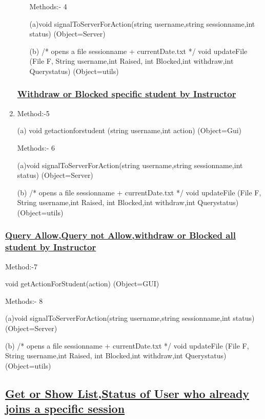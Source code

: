 \documentclass{article}
\begin{document}
\begin{enumerate}
\begin{enumerate}
Methods:- 4 

(a)void signalToServerForAction(string username,string sessionname,int status)        (Object=Server) 

(b)  /* opens a file sessionname + currentDate.txt  */ 
void updateFile (File F, String username,int Raised, int Blocked,int withdraw,int Querystatus)                 
                                                (Object=utils)
\end{enumerate}
\subsubsection*{\underline{Withdraw or Blocked specific student by Instructor}}
\item[{}{}]

Method:-5 

(a) void getactionforstudent (string username,int action)          (Object=Gui) 

Methods:- 6 

(a)void signalToServerForAction(string username,string sessionname,int status)        (Object=Server) 

(b)  /* opens a file sessionname + currentDate.txt  */ 
void updateFile (File F, String username,int Raised, int Blocked,int withdraw,int Querystatus)                 
                           (Object=utils)

\end{enumerate}
\subsubsection*{\underline{Query Allow,Query not Allow,withdraw or Blocked all student by Instructor }}
 
Method:-7 

void getActionForStudent(action)          (Object=GUI) 

Methods:- 8 

(a)void signalToServerForAction(string username,string sessionname,int status)        (Object=Server) 

(b)  /* opens a file sessionname + currentDate.txt  */ 
void updateFile (File F, String username,int Raised, int Blocked,int withdraw,int Querystatus)                 
                       (Object=utils) 
\subsection*{\underline{Get or Show List,Status of User who already joins a specific session}} 
\begin{center}

\end{center}
\end{document}
